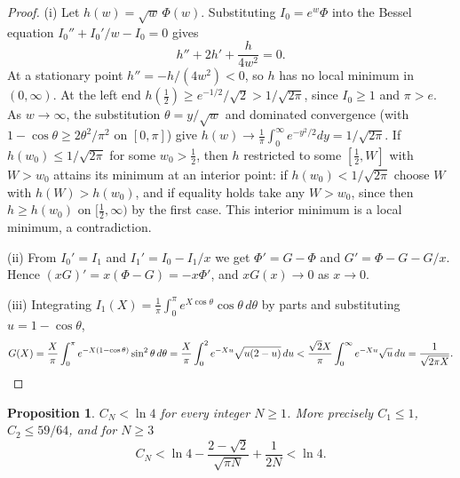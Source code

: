 \documentclass[11pt]{amsart}
\newtheorem{proposition}[theorem]{Proposition}
\theoremstyle{definition}
\theoremstyle{remark}
\begin{document}
\begin{proof}
(i) Let $h(w)=\sqrt w\,\Phi(w)$. Substituting $I_0=e^w\Phi$ into the Bessel equation $I_0''+I_0'/w-I_0=0$ gives
\[
 h''+2h'+\frac{h}{4w^2}=0.
\]
At a stationary point $h''=-h/(4w^2)<0$, so $h$ has no local minimum in $(0,\infty)$. At the left end $h(\tfrac12)\ge e^{-1/2}/\sqrt2>1/\sqrt{2\pi}$, since $I_0\ge1$ and $\pi>e$. As $w\to\infty$, the substitution $\theta=y/\sqrt w$ and dominated convergence (with $1-\cos\theta\ge2\theta^2/\pi^2$ on $[0,\pi]$) give $h(w)\to\frac1\pi\int_0^\infty e^{-y^2/2}dy=1/\sqrt{2\pi}$. If $h(w_0)\le1/\sqrt{2\pi}$ for some $w_0>\tfrac12$, then $h$ restricted to some $[\tfrac12,W]$ with $W>w_0$ attains its minimum at an interior point: if $h(w_0)<1/\sqrt{2\pi}$ choose $W$ with $h(W)>h(w_0)$, and if equality holds take any $W>w_0$, since then $h\ge h(w_0)$ on $[\tfrac12,\infty)$ by the first case. This interior minimum is a local minimum, a contradiction.

(ii) From $I_0'=I_1$ and $I_1'=I_0-I_1/x$ we get $\Phi'=G-\Phi$ and $G'=\Phi-G-G/x$. Hence $(xG)'=x(\Phi-G)=-x\Phi'$, and $xG(x)\to0$ as $x\to0$.

(iii) Integrating $I_1(X)=\frac1\pi\int_0^\pi e^{X\cos\theta}\cos\theta\,d\theta$ by parts and substituting $u=1-\cos\theta$,
\[
 G(X)=\frac X\pi\int_0^\pi e^{-X(1-\cos\theta)}\sin^2\theta\,d\theta=\frac X\pi\int_0^2e^{-Xu}\sqrt{u(2-u)}\,du
 <\frac{\sqrt2X}{\pi}\int_0^\infty e^{-Xu}\sqrt u\,du=\frac1{\sqrt{2\pi X}}.\qedhere
\]
\end{proof}

\begin{proposition}\label{prop:CN}
$C_N<\ln4$ for every integer $N\ge1$. More precisely $C_1\le1$, $C_2\le59/64$, and for $N\ge3$
\[
 C_N<\ln4-\frac{2-\sqrt2}{\sqrt{\pi N}}+\frac1{2N}<\ln4.
\]
\end{proposition}
\end{document}
